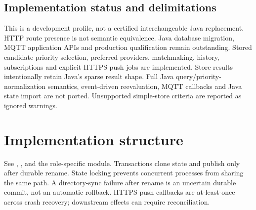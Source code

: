 \documentclass[a4paper]{arrowhead}
\begin{document}
\subsection{Implementation status and delimitations}
This is a development profile, not a certified interchangeable Java replacement. HTTP route presence is not semantic equivalence. Java database migration, MQTT application APIs and production qualification remain outstanding.
Stored candidate priority selection, preferred providers, matchmaking, history, subscriptions and explicit HTTPS push jobs are implemented. Store results intentionally retain Java's sparse result shape. Full Java query/priority-normalization semantics, event-driven reevaluation, MQTT callbacks and Java state import are not ported. Unsupported simple-store criteria are reported as ignored warnings.
\section{Implementation structure}
See , ,  and the role-specific module. Transactions clone state and publish only after durable rename. State locking prevents concurrent processes from sharing the same path. A directory-sync failure after rename is an uncertain durable commit, not an automatic rollback. HTTPS push callbacks are at-least-once across crash recovery; downstream effects can require reconciliation.
\end{document}
